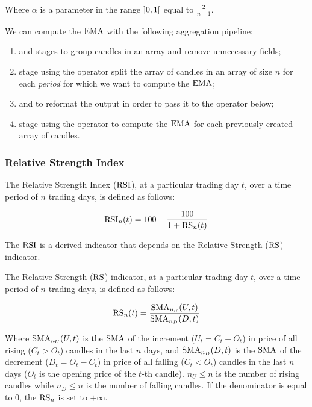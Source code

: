 Where \(\alpha\) is a parameter in the range \(\interval[open]{0}{1}\)
equal to \(\frac{2}{n + 1}\).

We can compute the \(\operatorname{EMA}\) with the following aggregation pipeline:

\begin{enumerate}
	\item {} and  stages to group candles in an
		array and remove unnecessary fields;
	\item {} stage using the  operator split the
		array of candles in an array of size \(n\) for each
		\emph{period} for which we want to compute the \(\operatorname{EMA}\);
	\item {} and  to reformat the output in
		order to pass it to the  operator below;
	\item {} stage using the  operator to
		compute the \(\operatorname{EMA}\) for each previously created array of
		candles.
\end{enumerate}

\subsubsection{Relative Strength Index}

The Relative Strength Index (\(\operatorname{RSI}\)), at a particular trading day \(t\), over
a time period of \(n\) trading days, is defined as follows:

\begin{equation}\label{eq:rsi}
	\operatorname{RSI}_n(t) = 100 - \frac{100}{1 + \operatorname{RS}_n(t)}
\end{equation}

The \(\operatorname{RSI}\) is a derived indicator that depends on the Relative Strength
(\(\operatorname{RS}\)) indicator.

The Relative Strength (\(\operatorname{RS}\)) indicator, at a particular trading day \(t\),
over a time period of \(n\) trading days, is defined as follows:

\begin{equation}\label{eq:rs}
	\operatorname{RS}_n(t) = \frac{\operatorname{SMA}_{n_U}(U,t)}{\operatorname{SMA}_{n_D}(D,t)}
\end{equation}

Where \(\operatorname{SMA}_{n_U}(U,t)\) is the \(\operatorname{SMA}\) of the increment (\(U_t = C_t - O_t\))
in price of all rising (\(C_t > O_t\)) candles in the last \(n\) days, and
\(\operatorname{SMA}_{n_D}(D,t)\) is the \(\operatorname{SMA}\) of the decrement (\(D_t = O_t - C_t\)) in
price of all falling (\(C_t < O_t\)) candles in the last \(n\) days (\(O_t\) is
the opening price of the \(t\)-th candle). \(n_U \leq n\) is the number of
rising candles while \(n_D \leq n\) is the number of falling candles. If the
denominator is equal to \(0\), the \(\operatorname{RS}_n\) is set to \(+\infty\).

